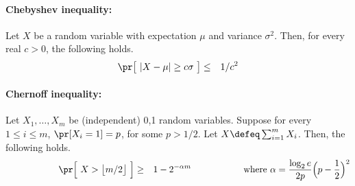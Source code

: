 \documentclass[11pt, a4paper]{article}
\begin{document}
\paragraph*{Chebyshev inequality:}
Let $X$ be a random variable with expectation $\mu$ and variance $\sigma^2$.
Then, for every real $c>0$, the following holds.
\begin{eqnarray*}
\pr \big[\ |X -\mu |\geq c\sigma\ \big] & \leq & 1/c^2
\end{eqnarray*}


\paragraph*{Chernoff inequality:}
Let $X_1,\ldots,X_m$ be (independent) 0,1 random variables.
Suppose for every $1\leq i \leq m$,
$\pr[X_i=1]=p$, for some $p > 1/2$.
Let $X\defeq \sum_{i=1}^m X_i$.
Then, the following holds.
\begin{eqnarray*}
\hspace{2cm}
\pr \Big[\ X > \big\lfloor m/2 \big\rfloor \ \Big] & \geq & 1 - 2^{-\alpha m}\hspace{2cm}\text{where} \ \alpha = \frac{\log_2 e}{2p}\Big(p-\frac{1}{2}\Big)^2
\end{eqnarray*}
\end{document}
